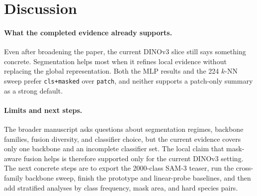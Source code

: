 \section{Discussion}

\paragraph{What the completed evidence already supports.}
Even after broadening the paper, the current DINOv3 slice still says something concrete. Segmentation helps most when it refines local evidence without replacing the global representation. Both the MLP results and the 224 $k$-NN sweep prefer \texttt{cls+masked} over \texttt{patch}, and neither supports a patch-only summary as a strong default.

\paragraph{Limits and next steps.}
The broader manuscript asks questions about segmentation regimes, backbone families, fusion diversity, and classifier choice, but the current evidence covers only one backbone and an incomplete classifier set. The local claim that mask-aware fusion helps is therefore supported only for the current DINOv3 setting. The next concrete steps are to export the 2000-class SAM-3 teaser, run the cross-family backbone sweep, finish the prototype and linear-probe baselines, and then add stratified analyses by class frequency, mask area, and hard species pairs.
